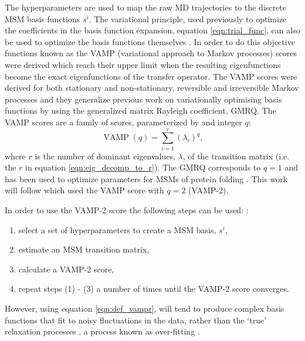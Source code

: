 The hyperparameters are used to map the raw MD trajectories to the discrete MSM basis functions $s^{i}$. The variational principle, used previously to optimize the coefficients in the basis function expansion, equation \ref{eqn:trial_func}, can also be used to optimize the basis functions themselves \cite{schererVariationalSelectionFeatures2019}\cite{husicOptimizedParameterSelection2016}. In order to do this objective functions known as the VAMP (variational approach to Markov processes) scores \cite{wuVariationalApproachLearning2019} were derived which reach their upper limit when the resulting eigenfunctions become the exact eigenfunctions of the transfer operator. The VAMP scores were derived for both stationary and non-stationary, reversible and irreversible Markov processes and they generalize previous work on variationally optimising basis functions by \cite{mcgibbonVariationalCrossvalidationSlow2015} using the generalized matrix Rayleigh coefficient, GMRQ. The VAMP scores are a family of scores, parameterized by and integer $q$\cite{wuVariationalApproachLearning2019}: 
\begin{equation}\label{eqn:def_vampr}
\operatorname{VAMP}(q)=\sum_{i=1}^{r}\left(\lambda_{i}\right)^{q}, 
\end{equation} 
where $r$ is the number of dominant eigenvalues, $\lambda$, of the transition matrix (i.e. the $r$ in equation \ref{eqn:eig_decomp_to_r}). The GMRQ corresponds to $q=1$ and has been used to optimize parameters for MSMs of protein folding \cite{husicOptimizedParameterSelection2016}. This work will follow \cite{schererVariationalSelectionFeatures2019} which used the VAMP  score with $q=2$ (VAMP-2). 

In order to use the VAMP-2 score the following steps can be used:  \cite{schererVariationalSelectionFeatures2019}:
\begin{enumerate}
    \item select a set of hyperparameters to create a MSM basis, $s^{i}$, 
    \item estimate an MSM transition matrix, 
    \item calculate a VAMP-2 score, 
    \item repeat steps (1) - (3) a number of times until the VAMP-2 score converges. 
\end{enumerate}
However, using equation \ref{eqn:def_vampr}, will tend to produce complex basis functions that fit to noisy fluctuations in the data, rather than the `true' relaxation processes \cite{mcgibbonVariationalCrossvalidationSlow2015}\cite{wuVariationalApproachLearning2019}\cite{schererVariationalSelectionFeatures2019}, a process known as over-fitting \cite{friedman2001elements}.

